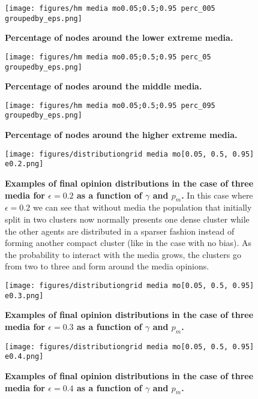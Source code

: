 \documentclass[10pt,letterpaper]{article}
\begin{document}
\begin{figure}
    \centering
    \texttt{[image: figures/hm media mo0.05;0.5;0.95 perc\_005 groupedby\_eps.png]}
    \caption{\textbf{Percentage of nodes around the lower extreme media.}}
    \label{fig:3mediaperc005byeps}
\end{figure}

\begin{figure}
    \centering
    \texttt{[image: figures/hm media mo0.05;0.5;0.95 perc\_05 groupedby\_eps.png]}
    \caption{\textbf{Percentage of nodes around the middle media.}}
    \label{fig:3mediaperc05byeps}
\end{figure}

\begin{figure}
    \centering
    \texttt{[image: figures/hm media mo0.05;0.5;0.95 perc\_095 groupedby\_eps.png]}
    \caption{\textbf{Percentage of nodes around the higher extreme media.}}
    \label{fig:3mediaperc095byeps}
\end{figure}

\begin{figure}
    \centering
    \texttt{[image: figures/distributiongrid media mo[0.05, 0.5, 0.95] e0.2.png]}
    \caption{\textbf{Examples of final opinion distributions in the case of three media for $\epsilon=0.2$ as a function of $\gamma$ and $p_m$.} In this case where $\epsilon=0.2$ we can see that without media the population that initially split in two clusters now normally presents one dense cluster while the other agents are distributed in a sparser fashion instead of forming another compact cluster (like in the case with no bias). As the probability to interact with the media grows, the clusters go from two to three and form around the media opinions.}
    \label{fig:3mediafinaldisteps02}
\end{figure}

\begin{figure}
    \centering
    \texttt{[image: figures/distributiongrid media mo[0.05, 0.5, 0.95] e0.3.png]}
    \caption{\textbf{Examples of final opinion distributions in the case of three media for $\epsilon=0.3$ as a function of $\gamma$ and $p_m$.}}
    \label{fig:3mediafinaldisteps03}
\end{figure}

\begin{figure}
    \centering
    \texttt{[image: figures/distributiongrid media mo[0.05, 0.5, 0.95] e0.4.png]}
    \caption{\textbf{Examples of final opinion distributions in the case of three media for $\epsilon=0.4$ as a function of $\gamma$ and $p_m$.}}
    \label{fig:3mediafinaldisteps04}
\end{figure}
\end{document}
